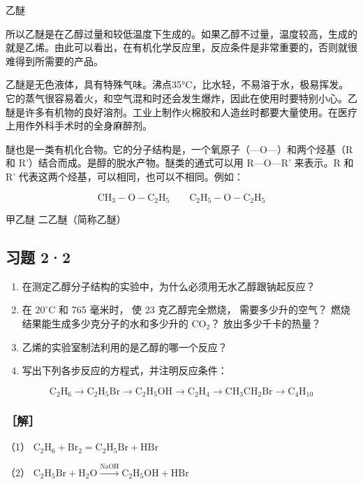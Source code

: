 乙醚

所以乙醚是在乙醇过量和较低温度下生成的。如果乙醇不过量，温度较高，生成的就是乙烯。由此可以看出，在有机化学反应里，反应条件是非常重要的，否则就很难得到所需要的产品。

乙醚是无色液体，具有特殊气味。沸点35°C，比水轻，不易溶于水，极易挥发。它的蒸气很容易着火，和空气混和时还会发生爆炸，因此在使用时要特别小心。乙醚是许多有机物的良好溶剂。工业上制作火棉胶和人造丝时都要大量使用。在医疗上用作外科手术时的全身麻醉剂。

醚也是一类有机化合物。它的分子结构是，一个氧原子（---O---）和两个烃基（R
和 R'）结合而成。是醇的脱水产物。醚类的通式可以用 R---O---R' 来表示。R
和 R' 代表这两个烃基，可以相同，也可以不相同。例如：

\[
\mathrm{CH}_{3}-\mathrm{O}-\mathrm{C}_{2}\mathrm{H}_{5}\qquad \mathrm{C}_{2}\mathrm{H}_{5}-\mathrm{O}-\mathrm{C}_{2}\mathrm{H}_{5}
\]

甲乙醚 二乙醚（简称乙醚）

\subsection{习题 2·2}

\begin{enumerate}
\item
  在测定乙醇分子结构的实验中，为什么必须用无水乙醇跟钠起反应？
\item
  在 \(20^{\circ} \mathrm{C}\) 和 765 毫米时， 使 23 克乙醇完全燃烧，
  需要多少升的空气？ 燃烧结果能生成多少克分子的水和多少升的
  \(\mathrm{CO}_{2}\)？ 放出多少千卡的热量？
\item
  乙烯的实验室制法利用的是乙醇的哪一个反应？
\item
  写出下列各步反应的方程式，并注明反应条件：
\end{enumerate}

\[
\mathrm{C} _ {2} \mathrm{H} _ {6} \rightarrow \mathrm{C} _ {2} \mathrm{H} _ {5} \mathrm{Br} \rightarrow \mathrm{C} _ {2} \mathrm{H} _ {5} \mathrm{OH} \rightarrow \mathrm{C} _ {2} \mathrm{H} _ {4} \rightarrow \mathrm{CH} _ {3} \mathrm{CH} _ {2} \mathrm{Br} \rightarrow \mathrm{C} _ {4} \mathrm{H} _ {10}
\]

\subsubsection{［解］}

（1） \(\mathrm{C_2H_6 + Br_2 = C_2H_5Br + HBr}\)

（2）
\(\mathrm{C_2H_5Br + H_2O\xrightarrow{\mathrm{NaOH}} C_2H_5OH + HBr}\)

